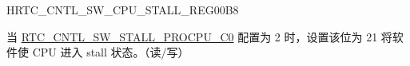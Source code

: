 \begin{register}{H}{RTC\_CNTL\_SW\_CPU\_STALL\_REG}{\hexprefix{}00B8}\label{regdesc:RTCCNTLSWCPUSTALLREG}
%
%
\regnewline%
\begin{regdesc}\begin{reglist}
\label{fielddesc:RTCCNTLSWSTALLPROCPUC1}\item [RTC\_CNTL\_SW\_STALL\_PROCPU\_C1] 当 \hyperref[fielddesc:RTCCNTLSWSTALLPROCPUC0]{RTC\_CNTL\_SW\_STALL\_PROCPU\_C0} 配置为 \hexprefix{}2 时，设置该位为 \hexprefix{}21 将软件使 CPU 进入 stall 状态。（读/写）
\end{reglist}\end{regdesc}
\end{register}



